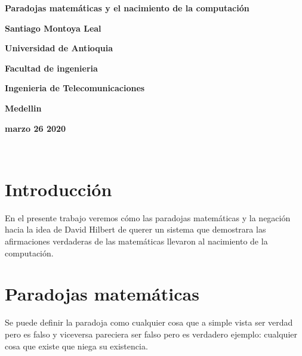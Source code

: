 \documentclass{article}
\begin{document}
\begin{center}
\bf{\sc\Huge Paradojas matemáticas y el nacimiento de la computación}\\
\end{center}
\vspace{80pt}
\begin{center}
\bf{\sc\Huge Santiago Montoya Leal }\\
\end{center}
\vspace{80pt}
\begin{center}
\bf{\sc\Huge Universidad de Antioquia}\\
\end{center}
\vspace{80pt}
\begin{center}
\bf{\sc\Huge Facultad de ingenieria}\\
\end{center}
\vspace{20pt}
\begin{center}
\bf{\sc\Huge Ingenieria de Telecomunicaciones}\\
\end{center}
\vspace{20pt}
\begin{center}
\bf{\sc\Huge Medellin}
\end{center}
\begin{center}
\bf{\sc\Huge marzo 26 2020}\\
\end{center}\
\newpage

\section{Introducción}
\large

En el presente trabajo veremos cómo las paradojas matemáticas y la negación hacia la idea de David Hilbert de querer un sistema que  demostrara las afirmaciones verdaderas de las matemáticas llevaron al nacimiento de la computación.

\section{Paradojas matemáticas}

\large
Se puede definir la paradoja como cualquier cosa que a simple vista ser verdad pero es falso y viceversa  pareciera ser falso pero es verdadero ejemplo: cualquier cosa que existe que niega su existencia.
\end{document}
